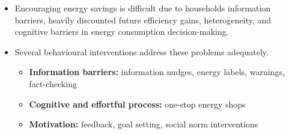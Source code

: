 \documentclass[
  11pt,
  captions=heading]{scrreport}
\begin{document}
\begin{itemize}
\item
  Encouraging energy savings is difficult due to
  households\textquotesingle{} information barriers, heavily discounted
  future efficiency gains, heterogeneity, and cognitive barriers in
  energy consumption decision-making.
\item
  Several behavioural interventions address these problems adequately.

  \begin{itemize}
  \item
    \textbf{Information barriers:} information nudges, energy labels,
    warnings, fact-checking
  \item
    \textbf{Cognitive and effortful process:} one-stop energy shops
  \item
    \textbf{Motivation:} feedback, goal setting, social norm
    interventions
  \end{itemize}
\end{itemize}
\end{document}
